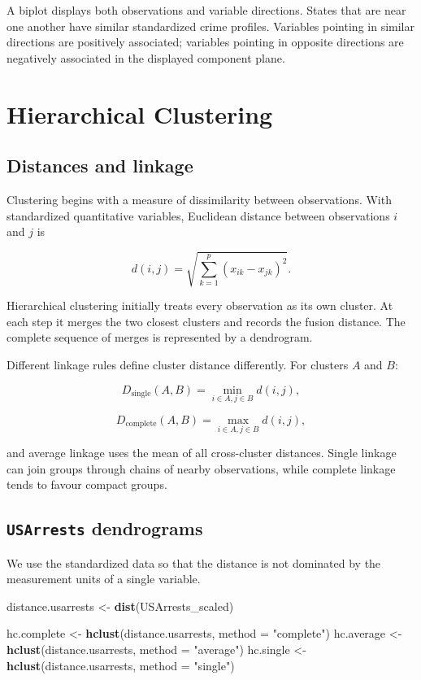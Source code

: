 \documentclass[
  11pt,
]{article}
\newenvironment{Shaded}{\begin{snugshade}}{\end{snugshade}}
\newcommand{\AttributeTok}[1]{\textcolor[rgb]{0.13,0.29,0.53}{#1}}
\newcommand{\FunctionTok}[1]{\textcolor[rgb]{0.13,0.29,0.53}{\textbf{#1}}}
\newcommand{\NormalTok}[1]{#1}
\newcommand{\OtherTok}[1]{\textcolor[rgb]{0.56,0.35,0.01}{#1}}
\newcommand{\StringTok}[1]{\textcolor[rgb]{0.31,0.60,0.02}{#1}}
\begin{document}
A biplot displays both observations and variable directions. States that
are near one another have similar standardized crime profiles. Variables
pointing in similar directions are positively associated; variables
pointing in opposite directions are negatively associated in the
displayed component plane.

\section{Hierarchical Clustering}\label{hierarchical-clustering}

\subsection{Distances and linkage}\label{distances-and-linkage}

Clustering begins with a measure of dissimilarity between observations.
With standardized quantitative variables, Euclidean distance between
observations \(i\) and \(j\) is

\[
 d(i,j) = \sqrt{\sum_{k=1}^{p}(x_{ik}-x_{jk})^2}.
\]

Hierarchical clustering initially treats every observation as its own
cluster. At each step it merges the two closest clusters and records the
fusion distance. The complete sequence of merges is represented by a
dendrogram.

Different linkage rules define cluster distance differently. For
clusters \(A\) and \(B\):

\[
D_{\mathrm{single}}(A,B) = \min_{i\in A,j\in B}d(i,j),
\]

\[
D_{\mathrm{complete}}(A,B) = \max_{i\in A,j\in B}d(i,j),
\]

and average linkage uses the mean of all cross-cluster distances. Single
linkage can join groups through chains of nearby observations, while
complete linkage tends to favour compact groups.

\subsection{\texorpdfstring{\texttt{USArrests}
dendrograms}{USArrests dendrograms}}\label{usarrests-dendrograms}

We use the standardized data so that the distance is not dominated by
the measurement units of a single variable.

\begin{Shaded}
\begin{Highlighting}[]
\NormalTok{distance.usarrests }\OtherTok{\textless{}{-}} \FunctionTok{dist}\NormalTok{(USArrests\_scaled)}

\NormalTok{hc.complete }\OtherTok{\textless{}{-}} \FunctionTok{hclust}\NormalTok{(distance.usarrests, }\AttributeTok{method =} \StringTok{"complete"}\NormalTok{)}
\NormalTok{hc.average }\OtherTok{\textless{}{-}} \FunctionTok{hclust}\NormalTok{(distance.usarrests, }\AttributeTok{method =} \StringTok{"average"}\NormalTok{)}
\NormalTok{hc.single }\OtherTok{\textless{}{-}} \FunctionTok{hclust}\NormalTok{(distance.usarrests, }\AttributeTok{method =} \StringTok{"single"}\NormalTok{)}
\end{Highlighting}
\end{Shaded}
\end{document}
